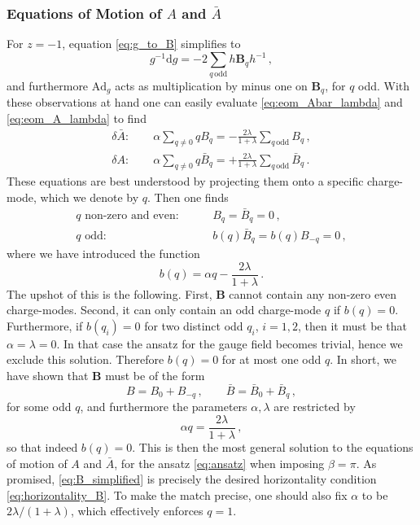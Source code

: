 \documentclass[11pt,a4paper]{article}
\numberwithin{equation}{section}
\numberwithin{table}{section}\setlength{\multlinegap}{25pt}
\newcommand{\dd}{\mathrm{d}}
\begin{document}
\subsubsection{Equations of Motion of $A$ and $\bar{A}$}

For $z=-1$, equation \eqref{eq:g_to_B} simplifies to
\begin{equation}
	g^{-1}\dd g = -2\sum_{q\, \mathrm{ odd}} h \mathbf{B}_q h^{-1}\,,
\end{equation}
and furthermore $\mathrm{Ad}_g$ acts as multiplication by minus one on $\mathbf{B}_q$, for $q$ odd. With these observations at hand one can easily evaluate \eqref{eq:eom_Abar_lambda} and \eqref{eq:eom_A_lambda} to find
\begin{align}
\label{eq:eom_Abar_B}\delta\bar{A}:\qquad	\alpha \sum_{q\neq 0} q B_{q}= -\frac{2\lambda}{1+\lambda}\sum_{q\, \mathrm{ odd}}B_q\,,\\
\label{eq:eom_A_Bbar}\delta A:\qquad	\alpha \sum_{q\neq 0} q \bar{B}_{q}=+\frac{2\lambda}{1+\lambda}\sum_{q\, \mathrm{ odd}}\bar{B}_q\,.
\end{align}
These equations are best understood by projecting them onto a specific charge-mode, which we denote by $q$. Then one finds 
\begin{align}
	\text{$q$ non-zero and even}:\qquad &B_{q} = \bar{B}_{q}=0\,,\\
	\text{$q$ odd}:\qquad &b(q)\bar{B}_{q}=b(q)B_{-q}=0\,,
\end{align}
where we have introduced the function
\begin{equation}
	b(q)=\alpha q - \frac{2\lambda}{1+\lambda}\,.
\end{equation}
The upshot of this is the following. First, $\mathbf{B}$ cannot contain any non-zero even charge-modes. Second, it can only contain an odd charge-mode $q$ if $b(q)=0$. Furthermore, if $b(q_i)=0$ for two distinct odd $q_i$, $i=1,2$, then it must be that $\alpha=\lambda=0$. In that case the ansatz for the gauge field becomes trivial, hence we exclude this solution. Therefore $b(q)=0$ for at most one odd $q$. In short, we have shown that $\mathbf{B}$ must be of the form
\begin{equation}\label{eq:B_simplified}
	B = B_0 + B_{-q}\,,\qquad \bar{B}=\bar{B}_0+\bar{B}_q\,,
\end{equation}
for some odd $q$, and furthermore the parameters $\alpha,\lambda$ are restricted by
\begin{equation}\label{eq:sol_alpha}
	\alpha q = \frac{2\lambda}{1+\lambda}\,,
\end{equation}
so that indeed $b(q)=0$. This is then the most general solution to the equations of motion of $A$ and $\bar{A}$, for the ansatz \eqref{eq:ansatz} when imposing $\beta=\pi$. As promised, \eqref{eq:B_simplified} is precisely the desired horizontality condition \eqref{eq:horizontality_B}. To make the match precise, one should also fix $\alpha$ to be $2\lambda/(1+\lambda)$, which effectively enforces $q=1$. 
\end{document}
